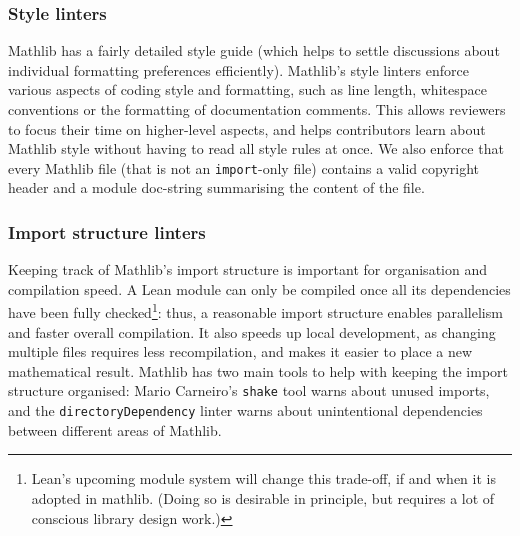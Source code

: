 \documentclass[runningheads]{llncs}
\def\Mathlib{Mathlib\xspace}
\def\mathlib{Mathlib\xspace}
\newcommand{\lean}[1]{\texttt{#1}}
\begin{document}

\subsubsection{Style linters}
\Mathlib has a fairly detailed style guide (which helps to settle discussions about individual formatting preferences efficiently).
\Mathlib's style linters enforce various aspects of coding style and formatting, such as line length, whitespace conventions or the formatting of documentation comments.
This allows reviewers to focus their time on higher-level aspects, and helps contributors learn about \mathlib style without having to read all style rules at once.
We also enforce that every \mathlib file (that is not an \lean{import}-only file) contains a valid copyright header and a module doc-string summarising the content of the file.

\subsubsection{Import structure linters}
Keeping track of \mathlib's import structure is important for organisation and compilation speed.
A Lean module can only be compiled once all its dependencies have been fully checked\footnote{Lean's upcoming module system will change this trade-off, if and when it is adopted in mathlib. (Doing so is desirable in principle, but requires a lot of conscious library design work.)}: thus, a reasonable import structure enables parallelism and faster overall compilation. It also speeds up local development, as changing multiple files requires less recompilation, and makes it easier to place a new mathematical result.
\Mathlib has two main tools to help with keeping the import structure organised:
Mario Carneiro's \texttt{shake} tool warns about unused imports, and the \lean{directoryDependency} linter warns about unintentional dependencies between different areas of \mathlib.
\end{document}

